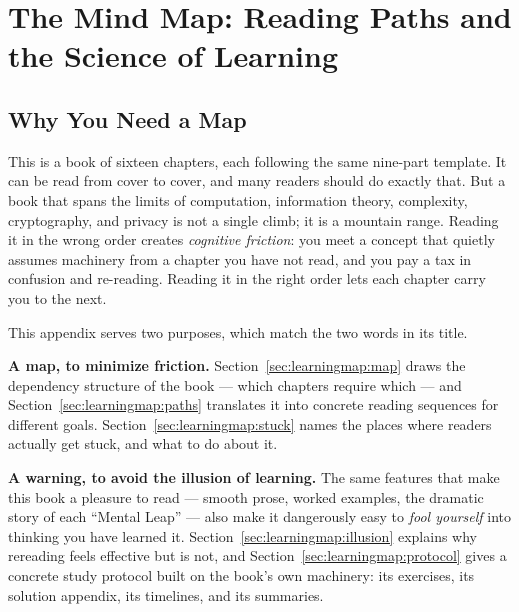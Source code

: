 
\chapter{The Mind Map: Reading Paths and the Science of Learning}
\label{app:learningmap}

\section{Why You Need a Map}
\label{sec:learningmap:why}

This is a book of sixteen chapters, each following the same nine-part template. It can be read from cover to cover, and many readers should do exactly that. But a book that spans the limits of computation, information theory, complexity, cryptography, and privacy is not a single climb; it is a mountain range.   Reading it in the wrong order creates \emph{cognitive friction}: you meet a concept that quietly assumes machinery from a chapter you have not read, and you pay a tax in confusion and re-reading. Reading it in the right order lets each chapter carry you to the next.

This appendix serves two purposes, which match the two words in its title.

\textbf{A map, to minimize friction.} Section~\ref{sec:learningmap:map} draws the dependency structure of the book --- which chapters require which --- and Section~\ref{sec:learningmap:paths} translates it into concrete reading sequences for different goals. Section~\ref{sec:learningmap:stuck} names the places where readers actually get stuck, and what to do about it.

\textbf{A warning, to avoid the illusion of learning.} The same features that make this book a pleasure to read --- smooth prose, worked examples, the dramatic story of each ``Mental Leap'' --- also make it dangerously easy to \emph{fool yourself} into thinking you have learned it. Section~\ref{sec:learningmap:illusion} explains why rereading feels effective but is not, and Section~\ref{sec:learningmap:protocol} gives a concrete study protocol built on the book's own machinery: its exercises, its solution appendix, its timelines, and its summaries.

